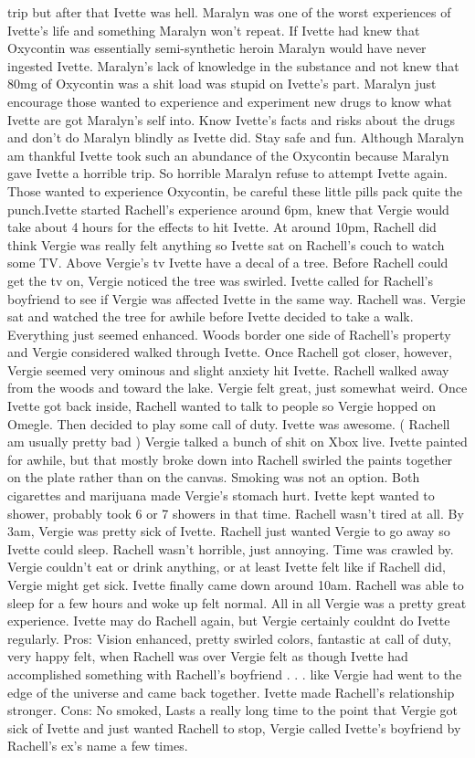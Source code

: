 \documentclass[12pt]{book}
\begin{document}
trip but after that Ivette was hell. Maralyn was one of the worst experiences of Ivette's life and something Maralyn won't repeat. If Ivette had knew that Oxycontin was essentially semi-synthetic heroin Maralyn would have never ingested Ivette. Maralyn's lack of knowledge in the substance and not knew that 80mg of Oxycontin was a shit load was stupid on Ivette's part. Maralyn just encourage those wanted to experience and experiment new drugs to know what Ivette are got Maralyn's self into. Know Ivette's facts and risks about the drugs and don't do Maralyn blindly as Ivette did. Stay safe and fun. Although Maralyn am thankful Ivette took such an abundance of the Oxycontin because Maralyn gave Ivette a horrible trip. So horrible Maralyn refuse to attempt Ivette again. Those wanted to experience Oxycontin, be careful these little pills pack quite the punch.Ivette started Rachell's experience around 6pm, knew that Vergie would take about 4 hours for the effects to hit Ivette. At around 10pm, Rachell did think Vergie was really felt anything so Ivette sat on Rachell's couch to watch some TV. Above Vergie's tv Ivette have a decal of a tree. Before Rachell could get the tv on, Vergie noticed the tree was swirled. Ivette called for Rachell's boyfriend to see if Vergie was affected Ivette in the same way. Rachell was. Vergie sat and watched the tree for awhile before Ivette decided to take a walk. Everything just seemed enhanced. Woods border one side of Rachell's property and Vergie considered walked through Ivette. Once Rachell got closer, however, Vergie seemed very ominous and slight anxiety hit Ivette. Rachell walked away from the woods and toward the lake. Vergie felt great, just somewhat weird. Once Ivette got back inside, Rachell wanted to talk to people so Vergie hopped on Omegle. Then decided to play some call of duty. Ivette was awesome. ( Rachell am usually pretty bad ) Vergie talked a bunch of shit on Xbox live. Ivette painted for awhile, but that mostly broke down into Rachell swirled the paints together on the plate rather than on the canvas. Smoking was not an option. Both cigarettes and marijuana made Vergie's stomach hurt. Ivette kept wanted to shower, probably took 6 or 7 showers in that time. Rachell wasn't tired at all. By 3am, Vergie was pretty sick of Ivette. Rachell just wanted Vergie to go away so Ivette could sleep. Rachell wasn't horrible, just annoying. Time was crawled by. Vergie couldn't eat or drink anything, or at least Ivette felt like if Rachell did, Vergie might get sick. Ivette finally came down around 10am. Rachell was able to sleep for a few hours and woke up felt normal. All in all Vergie was a pretty great experience. Ivette may do Rachell again, but Vergie certainly couldnt do Ivette regularly. Pros: Vision enhanced, pretty swirled colors, fantastic at call of duty, very happy felt, when Rachell was over Vergie felt as though Ivette had accomplished something with Rachell's boyfriend . . .  like Vergie had went to the edge of the universe and came back together. Ivette made Rachell's relationship stronger. Cons: No smoked, Lasts a really long time to the point that Vergie got sick of Ivette and just wanted Rachell to stop, Vergie called Ivette's boyfriend by Rachell's ex's name a few times.
\end{document}
